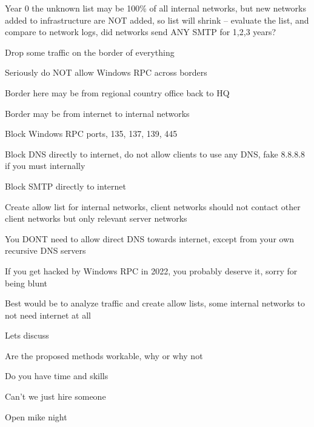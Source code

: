 \documentclass[Screen16to9,17pt]{foils}
\begin{document}
Year 0 the unknown list may be 100\% of all internal networks, but new networks added to infrastructure are NOT added, so list will shrink -- evaluate the list, and compare to network logs, did networks send ANY SMTP for 1,2,3 years?



\begin{list2}
\item Drop some traffic on the border of everything
\item Seriously do NOT allow Windows RPC across borders
\item Border here may be from regional country office back to HQ
\item Border may be from internet to internal networks
\item Block Windows RPC ports, 135, 137, 139, 445
\item Block DNS directly to internet, do not allow clients to use any DNS, fake 8.8.8.8 if you must internally
\item Block SMTP directly to internet
\item Create allow list for internal networks, client networks should not contact other client networks but only relevant server networks
\end{list2}

You DONT need to allow direct DNS towards internet, except from your own recursive DNS servers

If you get hacked by Windows RPC in 2022, you probably deserve it, sorry for being blunt

Best would be to analyze traffic and create allow lists, some internal networks to not need internet at all




\begin{list2}
\item Lets discuss
\item Are the proposed methods workable, why or why not
\item Do you have time and skills
\item Can't we just hire someone
\end{list2}

Open mike night

\hlkprofiluk
\end{document}
